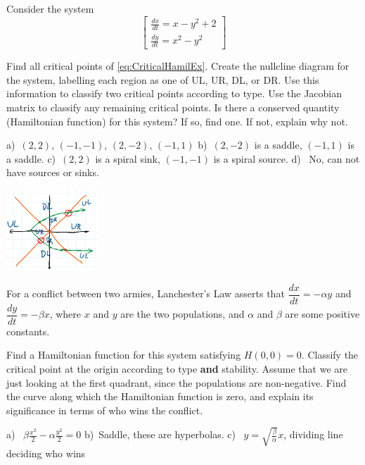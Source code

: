 \begin{exercise}
Consider the system
\begin{equation}
\begin{bmatrix}
\frac{dx}{dt}=x-y^2+2\\[12pt]
\frac{dy}{dt}=x^2-y^2
 \end{bmatrix}
\label{eq:CriticalHamilEx}
\end{equation}
\begin{tasks}
\task Find all critical points of \eqref{eq:CriticalHamilEx}.
\task Create the nullcline diagram for the system, labelling each region as one of UL, UR, DL, or DR. Use this information to classify two critical points according to type.
\task Use the Jacobian matrix to classify any remaining critical points.
\task Is there a conserved quantity (Hamiltonian function) for this system? If so, find one. If not, explain why not.
\end{tasks}
\end{exercise}
\comboSol{%
}
{%
\begin{multicols}{2}
\noindent a)~$(2, 2)$, $(-1, -1)$, $(2, -2)$, $(-1, 1)$ \quad b)~$(2, -2)$ is a saddle, $(-1, 1)$ is a saddle. \quad
c)~$(2,2)$ is a spiral sink, $(-1, -1)$ is a spiral source. \quad d)~ No, can not have sources or sinks.

\includegraphics[height=1.2in]{Images/NullclineDiagramSoln4.png}
\end{multicols}
}

\begin{exercise}
 For a conflict between two armies, Lanchester's Law asserts that $\dfrac{dx}{dt}=-\alpha y$ and $\dfrac{dy}{dt}=-\beta x$, %
where $x$ and $y$ are the two populations, and $\alpha$ and $\beta$ are some positive constants.

\begin{tasks}
\task Find a Hamiltonian function for this system satisfying $H(0,0)=0$. 
\task Classify the critical point at the origin according to type {\bf and} stability.
\task Assume that we are just looking at the first quadrant, since the populations are non-negative. Find the curve along which the Hamiltonian function is zero, and explain its significance in terms of who wins the conflict.
\end{tasks}
\end{exercise}
\comboSol{%
}
{%
a)~ $\beta\frac{x^2}{2} - \alpha \frac{y^2}{2} = 0$ \quad b)~Saddle, these are hyperbolas. \quad c)~ $y = \sqrt{\frac{\beta}{\alpha}}x$, dividing line deciding who wins
}

